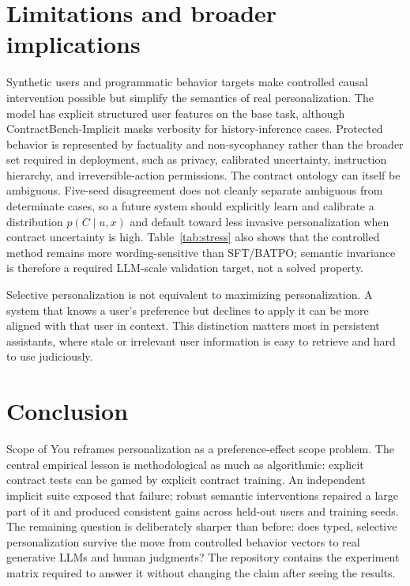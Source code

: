 \documentclass[10pt]{article}
\newcommand{\bench}{ContractBench-Implicit}
\begin{document}
\section{Limitations and broader implications}
Synthetic users and programmatic behavior targets make controlled causal intervention possible but simplify the semantics of real personalization. The model has explicit structured user features on the base task, although \bench{} masks verbosity for history-inference cases. Protected behavior is represented by factuality and non-sycophancy rather than the broader set required in deployment, such as privacy, calibrated uncertainty, instruction hierarchy, and irreversible-action permissions. The contract ontology can itself be ambiguous. Five-seed disagreement does not cleanly separate ambiguous from determinate cases, so a future system should explicitly learn and calibrate a distribution $p(C\mid u,x)$ and default toward less invasive personalization when contract uncertainty is high. Table~\ref{tab:stress} also shows that the controlled method remains more wording-sensitive than SFT/BATPO; semantic invariance is therefore a required LLM-scale validation target, not a solved property.

Selective personalization is not equivalent to maximizing personalization. A system that knows a user's preference but declines to apply it can be more aligned with that user in context. This distinction matters most in persistent assistants, where stale or irrelevant user information is easy to retrieve and hard to use judiciously.

\section{Conclusion}
Scope of You reframes personalization as a preference-effect scope problem. The central empirical lesson is methodological as much as algorithmic: explicit contract tests can be gamed by explicit contract training. An independent implicit suite exposed that failure; robust semantic interventions repaired a large part of it and produced consistent gains across held-out users and training seeds. The remaining question is deliberately sharper than before: does typed, selective personalization survive the move from controlled behavior vectors to real generative LLMs and human judgments? The repository contains the experiment matrix required to answer it without changing the claim after seeing the results.
\end{document}
